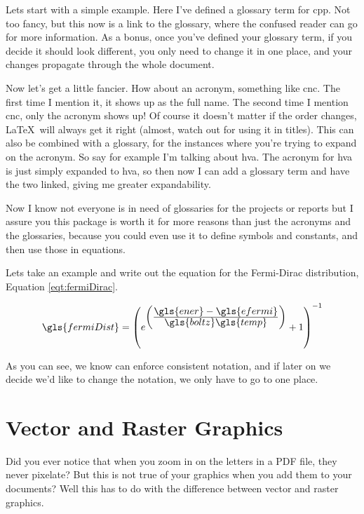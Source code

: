 \documentclass[hidelinks, float=false, crop=false]{article}
\newcommand\ddfrac[2]{\frac{\displaystyle #1}{\displaystyle #2}}
\begin{document}
        Lets start with a simple example. Here I've defined a glossary term for \gls{cpp}. Not 
        too fancy, but this now is a link to the glossary, where the confused reader can go for more
        information. As a bonus, once you've defined your glossary term, if you decide it should look 
        different, you only need to change it in one place, and your changes propagate through the
        whole document.
        
        Now let's get a little fancier. How about an acronym, something like \gls{cnc}. The first time
        I mention it, it shows up as the full name. The second time I mention \gls{cnc}, only the 
        acronym shows up! Of course it doesn't matter if the order changes, \LaTeX~will always get it 
        right (almost, watch out for using it in titles). This can also be combined with a glossary,
        for the instances where you're trying to expand on the acronym. So say for example I'm talking
        about \gls{hva}. The acronym for \gls{hva} is just simply expanded to \glsdesc{hva},
        so then now I can add a glossary term and have the two linked, giving me greater expandability.

        Now I know not everyone is in need of glossaries for the projects or reports but I assure you
        this package is worth it for more reasons than just the acronyms and the glossaries, because
        you could even use it to define symbols and constants, and then use those in equations.

        Lets take an example and write out the equation for the Fermi-Dirac distribution, Equation \ref{eqt:fermiDirac}.

        \begin{equation}
            \gls{fermiDist} = \left(e^{\left(\ddfrac{\gls{ener}-\gls{efermi}}{\gls{boltz}\gls{temp}}\right)}+1\right)^{-1}
            \label{eqt:fermiDirac}
        \end{equation}

        As you can see, we know can enforce consistent notation, and if later on we decide we'd like 
        to change the notation, we only have to go to one place.
        

    \section{Vector and Raster Graphics}
        Did you ever notice that when you zoom in on the letters in a PDF file, they never pixelate?
        But this is not true of your graphics when you add them to your documents? Well this has
        to do with the difference between vector and raster graphics. 
\end{document}
